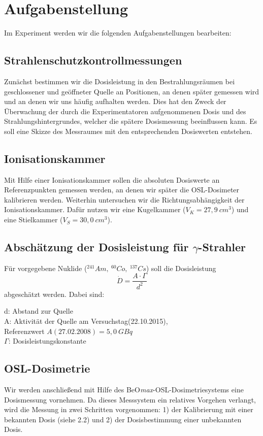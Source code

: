 \section{Aufgabenstellung}
Im Experiment werden wir die folgenden Aufgabenstellungen bearbeiten:
\subsection{Strahlenschutzkontrollmessungen}
Zunächst bestimmen wir die Dosisleistung in den Bestrahlungsräumen bei geschlossener und geöffneter Quelle an Positionen, an denen später gemessen wird und an denen wir uns häufig aufhalten werden. Dies hat den Zweck der Überwachung der durch die Experimentatoren aufgenommenen Dosis und des Strahlungshintergrundes, welcher die spätere Dosismessung beeinflussen kann. Es soll eine Skizze des Messraumes mit den entsprechenden Dosiswerten entstehen.

\subsection{Ionisationskammer}
Mit Hilfe einer Ionisationskammer sollen die absoluten Dosiswerte an Referenzpunkten gemessen werden, an denen wir später die OSL-Dosimeter kalibrieren werden. Weiterhin untersuchen wir die Richtungsabhängigkeit der Ionisationskammer. Dafür nutzen wir eine Kugelkammer ($V_K = 27,9\ cm^3$) und eine Stielkammer ($V_S = 30,0\ cm^3$).

\subsection{Abschätzung der Dosisleistung für $\gamma$-Strahler}
Für vorgegebene Nuklide ($^{241}Am,\ ^{60}Co,\ ^{137}Cs$) soll die Dosisleistung
\begin{equation}
	\dot{D}=\frac{A \cdot \Gamma}{d^2}
\end{equation}
abgeschätzt werden. Dabei sind:
\begin{center}
\begin{minipage}{.9\textwidth}
d: Abstand zur Quelle\\
	A: Aktivität der Quelle am Versuchstag(22.10.2015), \\
	Referenzwert $A(27.02.2008) = 5,0\ GBq$\\
	$\Gamma$: Dosisleistungskonstante
	
\end{minipage}
\end{center}

\subsection{OSL-Dosimetrie}
Wir werden anschließend mit Hilfe des BeO\textit{max}-OSL-Dosimetriesystems eine Dosismessung vornehmen. Da dieses Messsystem ein relatives Vorgehen verlangt, wird die Messung in zwei Schritten vorgenommen: 1) der Kalibrierung mit einer bekannten Dosis (siehe 2.2) und 2) der Dosisbestimmung einer unbekannten Dosis.